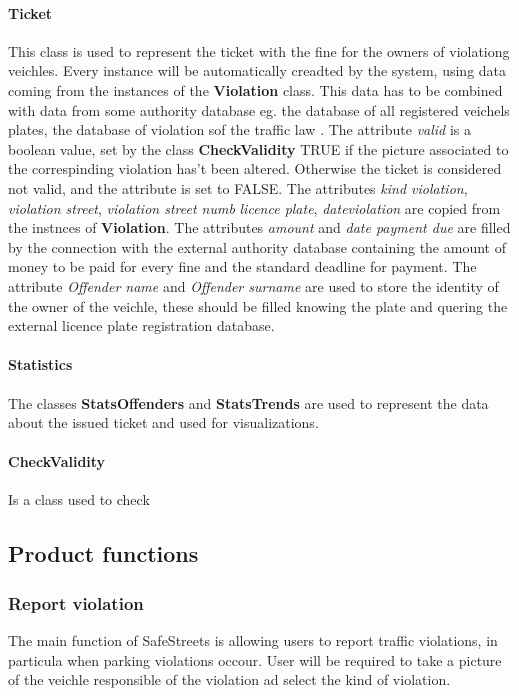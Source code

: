 \paragraph{Ticket}
This class is used to represent the ticket with the fine for the owners of violationg veichles. Every instance will be automatically creadted by the system, using data coming from the instances of the \textbf{Violation} class. This data has to be combined with data from some authority database eg. the database of all registered veichels plates, the database of violation sof the traffic law .
The attribute \textit{valid} is a boolean value, set by the class \textbf{CheckValidity} TRUE if the picture associated to the correspinding violation has't been altered. Otherwise the ticket is considered not valid, and the attribute is set to FALSE.
The attributes \textit{kind violation}, \textit{violation street}, \textit{violation street numb} \textit{licence plate}, \textit{dateviolation} are copied from the instnces of \textbf{Violation}.
The attributes \textit{amount} and \textit{date payment due} are filled by the connection with the external authority database containing the amount of money to be paid for every fine and the standard deadline for payment.
The attribute \textit{Offender name} and \textit{Offender surname} are used to store the identity of the owner of the veichle, these should be filled knowing the plate and quering the external licence plate registration database.

\paragraph{Statistics}
The classes \textbf{StatsOffenders} and \textbf{StatsTrends} are used to represent the data about the issued ticket and used for visualizations.

\paragraph{CheckValidity}
Is a class used to check


\subsection{Product functions}

\subsubsection{Report violation}
The main function of SafeStreets is allowing users to report traffic violations, in particula when parking violations occour.
 User will be required to take a picture of the veichle responsible of the violation ad select the kind of violation.

